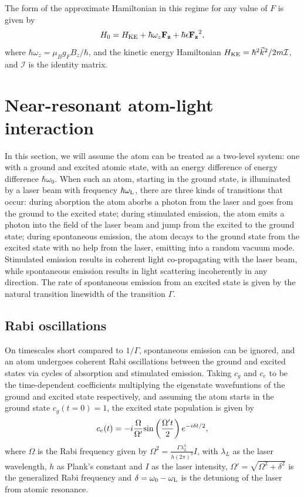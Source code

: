 The form of the approximate Hamiltonian in this regime for any value of $F$ is given by
\begin{equation}
H_0 = H_{\rm KE} + \hbar \omega_z \mathbf{F_z} + \hbar\epsilon \mathbf{F_z}^2,
\end{equation}
where $\hbar \omega_z = \mu_B g_F B_z/\hbar$, and the kinetic energy Hamiltonian $H_{\rm KE} = \hbar^2 \vec{k}^2/2m \mathcal{I}$, and $\mathcal{I}$ is the identity matrix.

\section{Near-resonant atom-light interaction}\label{chap:2sec:atomLight}

In this section, we will assume the atom can be treated as a two-level system: one with a ground and excited atomic state, with an energy difference of energy difference $\hbar\omega_0$. When such an atom, starting in the ground state, is illuminated by a laser beam with frequency $\hbar\omega_{\rm{L}}$, there are three kinds of transitions that occur: during aborption the atom aborbs a photon from the laser and goes from the ground to the excited state; during stimulated emission, the atom emits a photon into the field of the laser beam and jump from the excited to the ground state; during spontaneous emission, the atom decays to the ground state from the excited state with no help from the laser, emitting into a random vacuum mode. Stimulated emission results in coherent light co-propagating with the laser beam, while spontaneous emission results in light scattering incoherently in any direction. The rate of spontaneous emission from an excited state is given by the natural transition linewidth of the transition $\Gamma$. 

\subsection{Rabi oscillations}

On timescales short compared to $1/\Gamma$, spontaneous emission can be ignored, and an atom undergoes coherent Rabi oscillations between the ground and excited states via cycles of absorption and stimulated emission\cite{LCT}. Taking $c_g$ and $c_e$ to be the time-dependent coefficients multiplying the eigenstate wavefuntions of the ground and excited state respectively, and assuming the atom starts in the ground state $c_g(t=0)=1$, the excited state population is given by
\begin{equation}
c_e(t)=-i\frac{\Omega}{\Omega'}{\rm sin}\left(\frac{\Omega't}{2}\right)e^{-i\delta t/2},
\end{equation}
where $\Omega$ is the Rabi frequency given by $\Omega^2 = \frac{\Gamma\lambda_L^3}{h(2\pi)^3}I$, with $\lambda_L$ as the laser wavelength, $h$ as Plank's constant and $I$ as the laser intensity,  $\Omega'=\sqrt{\Omega^2+\delta^2}$ is the generalized Rabi frequency and $\delta=\omega_0-\omega_{\rm{L}}$ is the detuniong of the laser from atomic resonance. 

